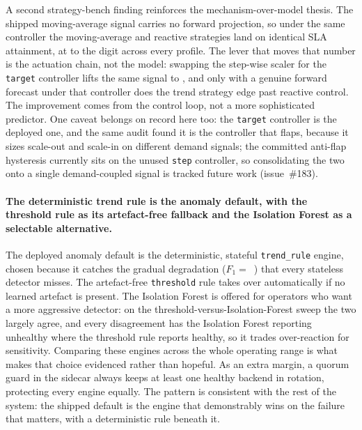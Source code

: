 A second strategy-bench finding reinforces the mechanism-over-model thesis. The shipped
moving-average signal carries no forward projection, so under the same controller the
moving-average and reactive strategies land on identical SLA attainment, at
\BMasSlaReactive{} to the digit across every profile. The lever that moves that number
is the actuation chain, not the model: swapping the step-wise scaler for the
\texttt{target} controller lifts the same signal to \BMasSlaTarget{}, and only with a
genuine forward forecast under that controller does the trend strategy edge past
reactive control. The improvement comes from the control loop, not a more sophisticated
predictor. One caveat belongs on record here too: the \texttt{target} controller is the
deployed one, and the same audit found it is the controller that flaps, because it sizes
scale-out and scale-in on different demand signals; the committed anti-flap hysteresis
currently sits on the unused \texttt{step} controller, so consolidating the two onto a
single demand-coupled signal is tracked future work (issue~\#183).

\paragraph{The deterministic trend rule is the anomaly default, with the threshold
rule as its artefact-free fallback and the Isolation Forest as a selectable
alternative.} The deployed anomaly default is the deterministic, stateful
\texttt{trend\_rule} engine, chosen because it catches the gradual degradation
($F_1 =$~\BManFone{}) that every stateless detector misses. The artefact-free
\texttt{threshold} rule takes over automatically if no learned artefact is present. The
Isolation Forest is offered for operators who want a more aggressive detector: on the
threshold-versus-Isolation-Forest sweep the two largely agree, and every disagreement
has the Isolation Forest reporting unhealthy where the threshold
rule reports healthy, so it trades over-reaction for sensitivity. Comparing these
engines across the whole operating range is what makes that choice evidenced rather than
hopeful. As an extra margin, a quorum guard in the sidecar always keeps at least one
healthy backend in rotation, protecting every engine equally. The pattern is consistent
with the rest of the system: the shipped default is the engine that demonstrably wins on
the failure that matters, with a deterministic rule beneath it.

